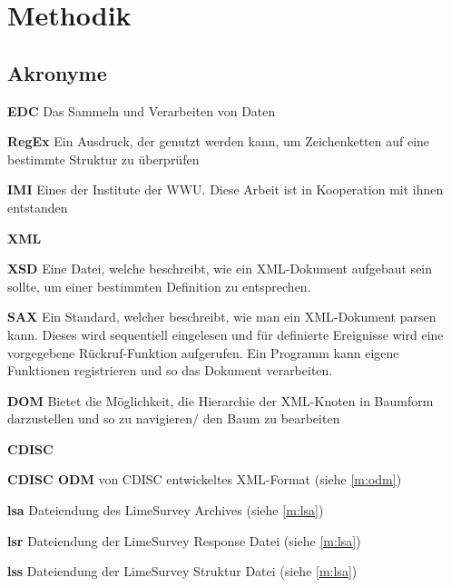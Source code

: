 \chapter{Methodik}
\label{ch:methodik}

\section{Akronyme}

\begin{description}[font=\sffamily\bfseries, leftmargin=0cm, itemsep=-0.15cm, style=nextline]
	\item \textbf{EDC}  Das Sammeln und Verarbeiten von Daten
	\item \textbf{RegEx}  Ein Ausdruck, der genutzt werden kann, um Zeichenketten auf eine bestimmte Struktur zu überprüfen
	\item \textbf{IMI}  Eines der Institute der WWU. Diese Arbeit ist in Kooperation mit ihnen entstanden
	\item \textbf{XML} 
	\item \textbf{XSD}  Eine Datei, welche beschreibt, wie ein XML-Dokument aufgebaut sein sollte, um einer bestimmten Definition zu entsprechen.
	\item \textbf{SAX}  Ein Standard, welcher beschreibt, wie man ein XML-Dokument parsen kann. Dieses wird sequentiell eingelesen und für definierte Ereignisse wird eine vorgegebene Rückruf-Funktion aufgerufen. Ein Programm kann eigene Funktionen registrieren und so das Dokument verarbeiten.
	\item \textbf{DOM}  Bietet die Möglichkeit, die Hierarchie der XML-Knoten in Baumform darzustellen und so zu navigieren/ den Baum zu bearbeiten
	\item \textbf{CDISC} 
	\item \textbf{CDISC ODM}  von CDISC entwickeltes XML-Format (siehe \cref{m:odm})
	\item \textbf{lsa} Dateiendung des LimeSurvey Archives (siehe \cref{m:lsa})
	\item \textbf{lsr} Dateiendung der LimeSurvey Response Datei (siehe \cref{m:lsa})
	\item \textbf{lss} Dateiendung der LimeSurvey Struktur Datei (siehe \cref{m:lsa})
\end{description}

